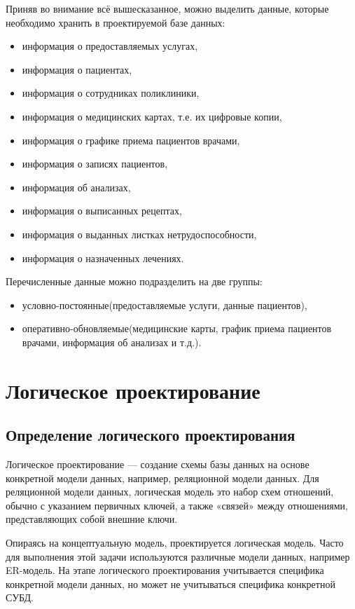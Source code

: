 \documentclass[14pt,a4paper,russian]{extreport}
\begin{document}
Приняв во внимание всё вышесказанное, можно выделить данные, которые необходимо хранить в проектируемой базе данных:
\begin{itemize}[noitemsep]
\renewcommand\labelitemi{--}
    \item информация о предоставляемых услугах,
    \item информация о пациентах,
    \item информация о сотрудниках поликлиники,
    \item информация о медицинских картах, т.е. их цифровые копии,
    \item информация о графике приема пациентов врачами,
    \item информация о записях пациентов,
    \item информация об анализах,
    \item информация о выписанных рецептах,
    \item информация о выданных листках нетрудоспособности,
    \item информация о назначенных лечениях.
\end{itemize}

Перечисленные данные можно подразделить на две группы:
\begin{itemize}[noitemsep]
    \item условно-постоянные(предоставляемые услуги, данные пациентов),
    \item оперативно-обновляемые(медицинские карты, график приема пациентов врачами, информация об
        анализах и т.д.).
\end{itemize}


\chapter{Логическое проектирование}
\section{Определение логического проектирования}
Логическое проектирование — создание схемы базы данных на основе конкретной модели
данных, например, реляционной модели данных. Для реляционной модели данных, логическая модель это
набор схем отношений, обычно с указанием первичных ключей, а также «связей» между
отношениями, представляющих собой внешние ключи.

Опираясь на концептуальную модель, проектируется логическая модель. Часто для выполнения этой
задачи используются различные модели данных, например ER-модель.
На этапе логического проектирования учитывается специфика конкретной модели данных, но может
не учитываться специфика конкретной СУБД. 
\end{document}
